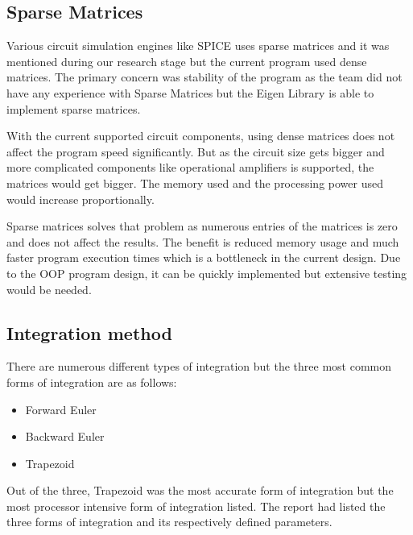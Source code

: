\documentclass[12pt,a4paper]{article}
\begin{document}
\subsection{Sparse Matrices}
Various circuit simulation engines like SPICE uses sparse matrices and it was mentioned \cite{OOP} during our research stage but 
the current program used dense matrices. The primary concern was stability of the program as the team did not have 
any experience with Sparse Matrices but the Eigen Library is able to implement sparse matrices. \par
With the current supported circuit components, using dense matrices does not affect the program speed significantly. But as 
the circuit size gets bigger and more complicated components like operational amplifiers is supported, the matrices would
get bigger. The memory used and the processing power used would increase proportionally. \par
Sparse matrices solves that problem as numerous entries of the matrices is zero and does not affect the results. The benefit is
reduced memory usage and much faster program execution times which is a bottleneck in the current design.
Due to the OOP program design, it can be quickly implemented but extensive testing would be needed.
\subsection{Integration method}
There are numerous different types of integration but the three most common forms of integration are as follows:
\begin{itemize}
	\item Forward Euler
	\item Backward Euler
	\item Trapezoid
\end{itemize}
Out of the three, Trapezoid was the most accurate form of integration but the most processor intensive form of integration listed.
The report had listed the three forms of integration and its respectively defined parameters. 
\end{document}
